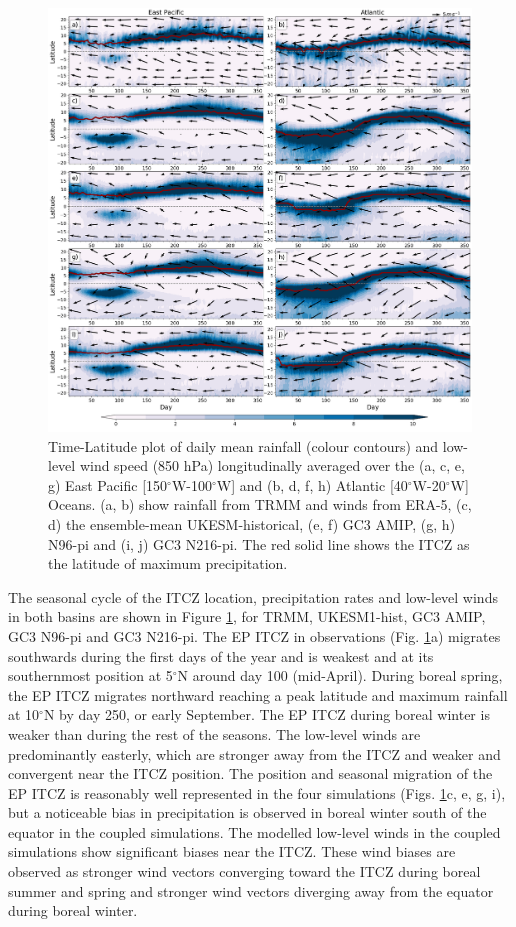 \begin{figure}[t!]
\centering
 \includegraphics[width=\linewidth]{figures/fig3_p2_v3.png}
\caption{ Time-Latitude plot of daily mean rainfall (colour contours) and low-level wind speed (850 hPa) longitudinally averaged over the (a, c, e, g) East Pacific [150$^\circ$W-100$^\circ$W] and (b, d, f, h) Atlantic [40$^\circ$W-20$^\circ$W] Oceans. (a, b) show rainfall from TRMM and winds from ERA-5, (c, d) the ensemble-mean UKESM-historical, (e, f) GC3 AMIP, (g, h) N96-pi and (i, j) GC3 N216-pi. The red solid line shows the ITCZ as the latitude of maximum precipitation.  }
\label{fig:4}
\end{figure}


The seasonal cycle of the ITCZ location, precipitation rates and low-level winds in both basins are shown in Figure \ref{fig:4}, for TRMM, UKESM1-hist, GC3 AMIP, GC3 N96-pi and GC3 N216-pi.   %
The EP ITCZ in observations (Fig. \ref{fig:4}a) migrates southwards during the first days of the year and is weakest and at its southernmost position at 5$^\circ$N around day 100 (mid-April).  
During boreal spring, the EP ITCZ migrates northward reaching a peak latitude and maximum rainfall at 10$^\circ$N by day 250, or early September. The EP ITCZ during boreal winter is weaker than during the rest of the seasons.
The low-level winds are predominantly easterly, which are stronger away from the ITCZ and weaker and convergent near the ITCZ position.
The position and seasonal migration of the EP ITCZ is reasonably well represented in the four simulations (Figs. \ref{fig:4}c, e, g, i), but a noticeable bias in precipitation is observed in  boreal winter south of the equator in the coupled simulations. The modelled  low-level winds in the coupled simulations show significant biases near the ITCZ.
These wind biases are observed as stronger wind vectors converging toward the ITCZ during boreal summer and spring and stronger wind vectors diverging away from the equator during boreal winter. 

